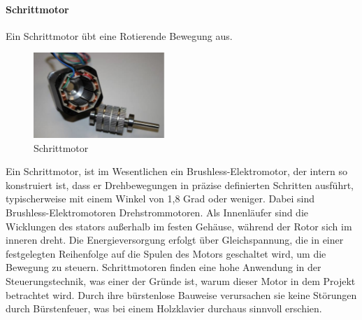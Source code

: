 \paragraph{Schrittmotor\cite*[siehe ][]{Aufbau.Elektromotoren}}
Ein Schrittmotor übt eine Rotierende Bewegung aus.
\begin{figure}[htbp]
	\centering
	\includegraphics[width=5cm]{img/Schrittmotor}
	\caption{Schrittmotor\cite*[siehe ][]{Aufbau.Elektromotoren}}
	\label{fig:Linearmotor}
\end{figure}
Ein Schrittmotor, ist im Wesentlichen ein Brushless-Elektromotor, der intern so konstruiert ist,
dass er Drehbewegungen in präzise definierten Schritten ausführt, typischerweise mit einem Winkel von 1,8 Grad oder weniger.
Dabei sind Brushless-Elektromotoren Drehstrommotoren. Als Innenläufer sind die Wicklungen des stators außerhalb im festen Gehäuse,
während der Rotor sich im inneren dreht.
Die Energieversorgung erfolgt über Gleichspannung, die in einer festgelegten Reihenfolge auf die Spulen des Motors
geschaltet wird, um die Bewegung zu steuern.
Schrittmotoren finden eine hohe Anwendung in der Steuerungstechnik, was einer der Gründe ist, warum dieser Motor in dem
Projekt betrachtet wird. Durch ihre bürstenlose Bauweise verursachen sie keine Störungen durch Bürstenfeuer, was bei einem
Holzklavier durchaus sinnvoll erschien.



